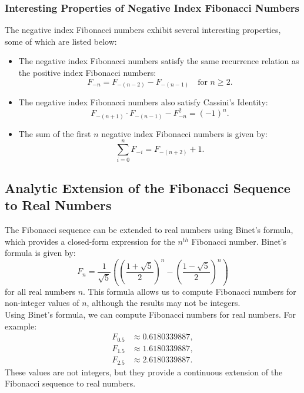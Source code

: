 \documentclass[openany]{book}
\begin{document}
\subsubsection{Interesting Properties of Negative Index Fibonacci Numbers}
The negative index Fibonacci numbers exhibit several interesting properties, some of which are listed below:
\begin{itemize}
    \item The negative index Fibonacci numbers satisfy the same recurrence relation as the positive index Fibonacci numbers:
    \[
        F_{-n} = F_{-(n-2)} - F_{-(n-1)} \quad \text{for } n \geq 2.
    \]
    \item The negative index Fibonacci numbers also satisfy Cassini's Identity:
    \[
        F_{-(n+1)} \cdot F_{-(n-1)} - F_{-n}^2 = (-1)^n.
    \]
    \item The sum of the first $n$ negative index Fibonacci numbers is given by:
    \[
        \sum_{i=0}^{n} F_{-i} = F_{-(n+2)} + 1.
    \]
\end{itemize}
\subsection{Analytic Extension of the Fibonacci Sequence to Real Numbers}
The Fibonacci sequence can be extended to real numbers using Binet's formula, which provides a closed-form expression for the $n^{th}$ Fibonacci number. Binet's formula is given by:
\[
    F_n = \frac{1}{\sqrt{5}} \left( \left( \frac{1 + \sqrt{5}}{2} \right)^n - \left( \frac{1 - \sqrt{5}}{2} \right)^n \right)
\]
for all real numbers $n$. This formula allows us to compute Fibonacci numbers for non-integer values of $n$, although the results may not be integers. \\
Using Binet's formula, we can compute Fibonacci numbers for real numbers. For example:
\begin{align*}
    F_{0.5} &\approx 0.6180339887, \\
    F_{1.5} &\approx 1.6180339887, \\
    F_{2.5} &\approx 2.6180339887.  
\end{align*}
These values are not integers, but they provide a continuous extension of the Fibonacci sequence to real numbers. \\
\end{document}
